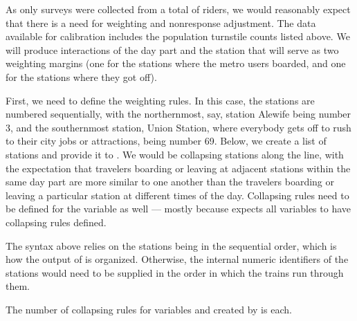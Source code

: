 

\noindent
\begin{stlog}
\nullskip
\end{stlog}


As only \nullskip surveys were collected from a total of
\nullskip riders, we would reasonably expect that there is a need
for weighting and nonresponse adjustment.
The data available for calibration includes the population turnstile counts
listed above. We will produce interactions of the day part and the station that will serve as two
weighting margins (one for the stations where the metro users boarded, and one for the stations
where they got off).

First, we need to define the weighting rules. In this case, the stations are numbered sequentially,
with the northernmost, say, station Alewife being number 3, and the southernmost station,
Union Station, where everybody gets off to rush to their city jobs or attractions, being number 69.
Below, we create a list of stations and provide it to .
We would be collapsing stations along the line, with the expectation that travelers boarding or leaving
at adjacent stations within the same day part are more similar to one another than the travelers
boarding or leaving a particular station at different times of the day. Collapsing rules
need to be defined for the  variable as well --- mostly because 
expects all variables to have collapsing rules defined.

\begin{stlog}
\nullskip
\end{stlog}

The syntax above relies on the stations being in the sequential order, which is how
the output of  is organized. Otherwise, the internal numeric identifiers of the stations
would need to be supplied in the order in which the trains run through them.

The number of collapsing rules for variables  and 
created by 
is \nullskip each.

